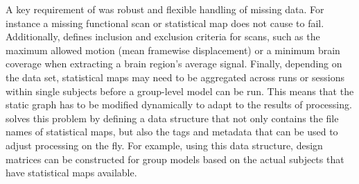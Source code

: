 

A key requirement of  was robust and flexible handling of missing data. For instance a missing functional scan or statistical map does not cause  to fail. Additionally,  defines inclusion and exclusion criteria for scans, such as the maximum allowed motion (mean framewise displacement) or a minimum brain coverage when extracting a brain region's average signal. Finally, depending on the data set, statistical maps may need to be aggregated across runs or sessions within single subjects before a group-level model can be run. This means that the static graph has to be modified dynamically to adapt to the results of processing.  solves this problem by defining a data structure that not only contains the file names of statistical maps, but also the tags and metadata that can be used to adjust processing on the fly. For example, using this data structure, design matrices can be constructed for group models based on the actual subjects that have statistical maps available.
